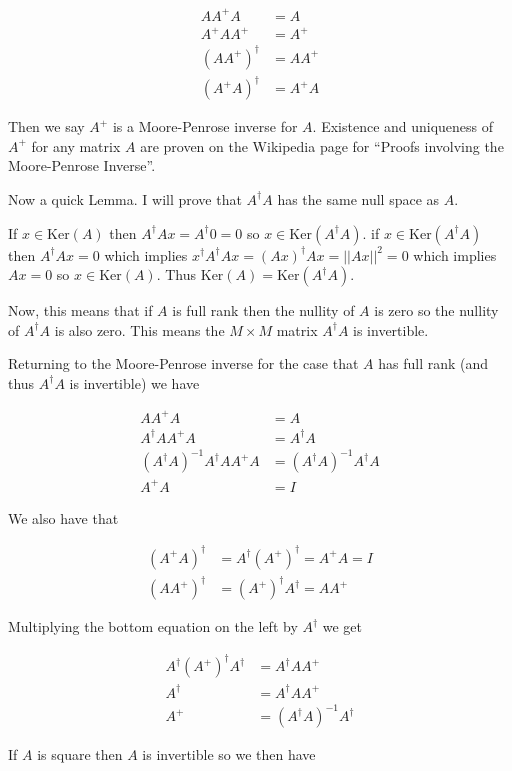\documentclass[12pt]{article}
\begin{document}
\begin{align}
AA^+A &= A\\
A^+AA^+ &= A^+\\
(AA^+)^{\dag} &= AA^+\\
(A^+A)^{\dag} &= A^+A
\end{align}

Then we say $A^+$ is a Moore-Penrose inverse for $A$. Existence and uniqueness of $A^+$ for any matrix $A$ are proven on the Wikipedia page for ``Proofs involving the Moore-Penrose Inverse''.

Now a quick Lemma. I will prove that $A^{\dag} A$ has the same null space as $A$.

If $x \in \text{Ker}(A)$ then $A^{\dag}Ax = A^{\dag}0 = 0$ so $x\in \text{Ker}(A^{\dag}A)$.
if $x\in \text{Ker}(A^{\dag}A)$ then $A^{\dag}Ax=0$ which implies $x^{\dag}A^{\dag}Ax = (Ax)^{\dag}Ax = ||Ax||^2 = 0$ which implies $Ax=0$ so $x\in\text{Ker}(A)$.
Thus $\text{Ker}(A) = \text{Ker}(A^{\dag}A)$.

Now, this means that if $A$ is full rank then the nullity of $A$ is zero so the nullity of $A^{\dag}A$ is also zero. This means the $M\times M$ matrix $A^{\dag}A$ is invertible.

Returning to the Moore-Penrose inverse for the case that $A$ has full rank (and thus $A^{\dag}A$ is invertible) we have

\begin{align}
A A^+ A &= A\\
A^{\dag} A A^+ A &= A^{\dag} A\\
(A^{\dag}A)^{-1}A^{\dag}AA^+A &= (A^{\dag} A)^{-1} A^{\dag} A\\
A^+ A &= I
\end{align}

We also have that

\begin{align}
(A^+A)^{\dag} &= A^{\dag} (A^+)^{\dag} = A^+ A = I\\
(AA^+)^{\dag} &= (A^+)^{\dag}A^{\dag} = A A^+
\end{align}

Multiplying the bottom equation on the left by $A^{\dag}$ we get

\begin{align}
A^{\dag}(A^+)^{\dag}A^{\dag} &= A^{\dag}A A^+\\
A^{\dag} &= A^{\dag}A A^+\\
A^+ &= (A^{\dag} A)^{-1} A^{\dag}
\end{align}

If $A$ is square then $A$ is invertible so we then have
\end{document}
